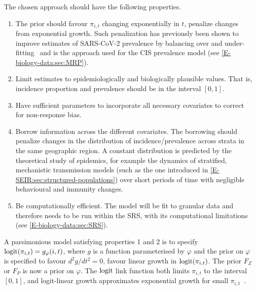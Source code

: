 \documentclass[thesis.tex]{subfiles}
\begin{document}
The chosen approach should have the following properties.
\begin{enumerate}
    \item The prior should favour $\pi_{i,t}$ changing exponentially in $t$, \ie penalize changes from exponential growth.
        Such penalization has previously been shown to improve estimates of SARS-CoV-2 prevalence by balancing over and under-fitting~\autocite{ealesAppropriately} and is the approach used for the CIS prevalence model (see \cref{E-biology-data:sec:MRP}).
    \item Limit estimates to epidemiologically and biologically plausible values.
        That is, incidence proportion and prevalence should be in the interval $[0, 1]$.
    \item Have sufficient parameters to incorporate all necessary covariates to correct for non-response bias.
    \item Borrow information across the different covariates.
        The borrowing should penalize changes in the distribution of incidence/prevalence across strata in the same geographic region.
        A constant distribution is predicted by the theoretical study of epidemics, for example the dynamics of stratified, mechanistic transmission models (such as the one introduced in \cref{E-SEIR:sec:structured-populations}) over short periods of time with negligible behavioural and immunity changes.
    \item Be computationally efficient.
        The model will be fit to granular data and therefore needs to be run within the SRS, with its computational limitations (see \cref{E-biology-data:sec:SRS}).
\end{enumerate}

A parsimonious model satisfying properties 1 and 2 is to specify $\operatorname{logit}(\pi_{i,t}) = g_\varphi(i, t)$, where $g$ is a function parameterised by $\varphi$ and the prior on $\varphi$ is specified to favour $d^2g/dt^2 = 0$, \ie favour linear growth in $\operatorname{logit}(\pi_{i,t})$.
The prior $F_Z$ or $F_P$ is now a prior on $\varphi$.
The $\operatorname{logit}$ link function both limits $\pi_{i,t}$ to the interval $[0, 1]$, and logit-linear growth approximates exponential growth for small $\pi_{i,t}$~\autocite{ealesAppropriately}.
\end{document}
